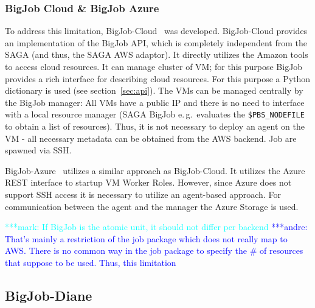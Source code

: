 \documentclass[]{article}
\newcommand{\alnote}[1]{ {\textcolor{blue} { ***andre: #1 }}}
\newcommand{\msnote}[1]{ {\textcolor{cyan} { ***mark: #1 }}}
\newcommand{\alnote}[1]{}
\begin{document}
\subsubsection{BigJob Cloud \& BigJob Azure}

To address this limitation, BigJob-Cloud~\cite{saga_bigjob_condor_cloud} was
developed. BigJob-Cloud provides an implementation of the BigJob API, which is
completely independent from the SAGA (and thus, the SAGA AWS adaptor). It
directly utilizes the Amazon tools to access cloud resources. It can manage
cluster of VM; for this purpose BigJob provides a rich interface for describing
cloud resources. For this purpose a Python dictionary is used (see
section~\ref{sec:api}). The VMs can be managed centrally by the BigJob manager:
All VMs have a public IP and there is no need to interface with a local resource
manager (SAGA BigJob e.\,g.\ evaluates the \texttt{\$PBS\_NODEFILE} to obtain a
list of resources). Thus, it is not necessary to deploy an agent on the VM - all
necessary metadata can be obtained from the AWS backend. Job are spawned via
SSH.



BigJob-Azure~\cite{10.1109/CloudCom.2010.85} utilizes a similar approach as
BigJob-Cloud. It utilizes the Azure REST interface to startup VM Worker Roles.
However, since Azure does not support SSH access it is necessary to utilize an
agent-based approach. For communication between the agent and the manager the
Azure Storage is used.

\msnote{If BigJob is the atomic unit, it should not differ per
backend}\alnote{That's mainly a restriction of the job package which does not
really map to AWS. There is no common way in the job package to specify the \#
of resources that suppose to be used. Thus, this limitation}


\subsection{BigJob-Diane}
\end{document}
